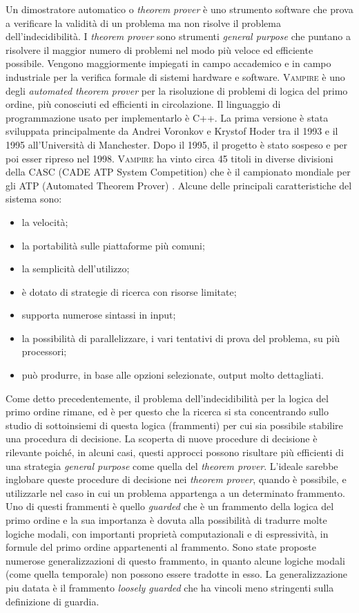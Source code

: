 Un dimostratore automatico o \emph{theorem prover} è uno strumento software che prova a verificare la validità di un problema ma non risolve il problema dell'indecidibilità.
I \emph{theorem prover} sono strumenti \emph{general purpose} che puntano a risolvere il maggior numero di problemi nel modo più veloce 
ed efficiente possibile. Vengono maggiormente impiegati in campo accademico e in campo industriale per la verifica formale di sistemi hardware e software.
\textsc{Vampire} è uno degli \emph{automated theorem prover} per la risoluzione di 
problemi di logica del primo ordine, più conosciuti ed efficienti in circolazione.
Il linguaggio di programmazione usato per implementarlo è C++. La prima versione è stata sviluppata principalmente 
da Andrei Voronkov e Krystof Hoder tra il 1993 e il 1995 all'Università di Manchester. Dopo il 1995, 
il progetto è stato sospeso e per poi esser ripreso nel 1998. \textsc{Vampire} ha vinto circa 45 titoli in diverse divisioni 
della CASC (CADE ATP System Competition) che è il campionato mondiale per gli ATP (Automated Theorem Prover) \cite{kovacs2013first,riazanov2002design}.
Alcune delle principali caratteristiche del sistema sono:
\begin{itemize}
    \item la velocità;
    \item la portabilità sulle piattaforme più comuni;
    \item la semplicità dell'utilizzo;
    \item è dotato di strategie di ricerca con risorse limitate;
    \item supporta numerose sintassi in input;
    \item la possibilità di parallelizzare, i vari tentativi di prova del problema, su più processori;
    \item può produrre, in base alle opzioni selezionate, output molto dettagliati. 
\end{itemize}

Come detto precedentemente, il problema dell'indecidibilità per la logica del primo ordine rimane, ed è per questo che
la ricerca si sta concentrando sullo studio di sottoinsiemi di questa logica (frammenti) per cui sia 
possibile stabilire una procedura di decisione. La scoperta di nuove procedure di decisione è rilevante poiché, 
in alcuni casi, questi approcci possono risultare più efficienti di una strategia \emph{general purpose} 
come quella del \emph{theorem prover}. 
L'ideale sarebbe inglobare queste procedure di decisione nei 
\emph{theorem prover}, quando è possibile, e utilizzarle nel caso in cui un problema appartenga a un determinato frammento.
Uno di questi frammenti è quello \emph{guarded} che è un frammento della logica del primo ordine e la sua importanza 
è dovuta alla possibilità  di tradurre molte logiche modali, con importanti proprietà computazionali 
e di espressività, in formule del primo ordine appartenenti al frammento. Sono state proposte numerose generalizzazioni di questo 
frammento, in quanto alcune logiche modali (come quella temporale) non possono essere tradotte in esso. La generalizzazione 
piu datata è il frammento \emph{loosely guarded} che ha vincoli meno stringenti sulla definizione di guardia.

